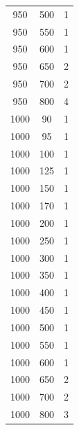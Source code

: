\begin{longtable}{c c c}
950 & 500 & 1 \\
950 & 550 & 1 \\
950 & 600 & 1 \\
950 & 650 & 2 \\
950 & 700 & 2 \\
950 & 800 & 4 \\
1000 & 90 & 1 \\
1000 & 95 & 1 \\
1000 & 100 & 1 \\
1000 & 125 & 1 \\
1000 & 150 & 1 \\
1000 & 170 & 1 \\
1000 & 200 & 1 \\
1000 & 250 & 1 \\
1000 & 300 & 1 \\
1000 & 350 & 1 \\
1000 & 400 & 1 \\
1000 & 450 & 1 \\
1000 & 500 & 1 \\
1000 & 550 & 1 \\
1000 & 600 & 1 \\
1000 & 650 & 2 \\
1000 & 700 & 2 \\
1000 & 800 & 3 \\
\end{longtable}

